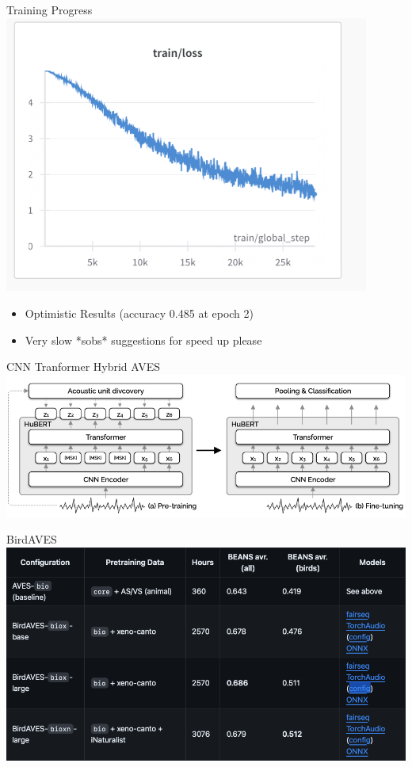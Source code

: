 \begin{frame}{Training Progress}
    \centering
    \includegraphics[height=0.7\textheight,width=0.9\textwidth,keepaspectratio]{images/progress_train.png}
    \begin{itemize}
        \item Optimistic Results (accuracy 0.485 at epoch 2)
        \item Very slow *sobs* suggestions for speed up please~
    \end{itemize}
\end{frame}

\begin{frame}{CNN Tranformer Hybrid AVES}
    \centering
    \includegraphics[height=0.8\textheight,width=1\textwidth,keepaspectratio]{images/Aves_architecture.png}  
\end{frame}

\begin{frame}{BirdAVES}
    \centering
    \includegraphics[height=0.7\textheight,width=1\textwidth,keepaspectratio]{images/BirdAves.png}  
\end{frame}

